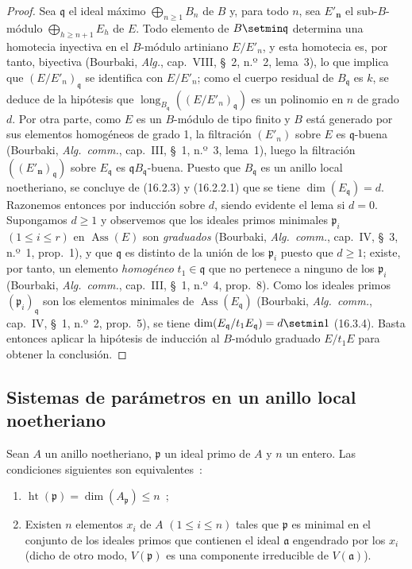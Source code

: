 \begin{proof}
Sea $\mathfrak{q}$ el ideal máximo $\bigoplus_{n\geq1}B_n$ de $B$ y, para todo
$n$, sea $E'_{\boldsymbol n}$ el sub-$B$-módulo $\bigoplus_{h\geq n+1}E_h$ de $E$. Todo
elemento de $B\setmin\mathfrak{q}$ determina una homotecia inyectiva en el
$B$-módulo artiniano $E/E'_n$, y esta homotecia es, por tanto, biyectiva
(Bourbaki, \emph{Alg.}, cap.~VIII, \S~2, n.º~2, lema~3), lo que implica que
$(E/E'_n)_{\mathfrak{q}}$ se identifica con $E/E'_n$; como el cuerpo residual
de $B_{\mathfrak{q}}$ es $k$, se deduce de la hipótesis que
$\operatorname{long}_{B_{\mathfrak{q}}}((E/E'_n)_{\mathfrak{q}})$ es un
polinomio en $n$ de grado $d$. Por otra parte, como $E$ es un $B$-módulo de
tipo finito y $B$ está generado por sus elementos homogéneos de grado 1, la
filtración $(E'_n)$ sobre $E$ es $\mathfrak{q}$-buena (Bourbaki,
\emph{Alg.~comm.}, cap.~III, \S~1, n.º~3, lema~1), luego la filtración
$((E'_{\boldsymbol n})_{\mathfrak{q}})$ sobre $E_{\mathfrak{q}}$ es
$\mathfrak{q}B_{\mathfrak{q}}$-buena. Puesto que $B_{\mathfrak{q}}$ es un
anillo local noetheriano, se concluye de (16.2.3) y (16.2.2.1) que se tiene
$\dim(E_{\mathfrak{q}})=d$. Razonemos entonces por inducción sobre $d$, siendo
evidente el lema si $d=0$. Supongamos $d\geq1$ y observemos que los ideales
primos minimales $\mathfrak{p}_i$ $(1\leq i\leq r)$ en
$\operatorname{Ass}(E)$ son \emph{graduados} (Bourbaki, \emph{Alg.~comm.},
cap.~IV, \S~3, n.º~1, prop.~1), y que $\mathfrak{q}$ es distinto de la unión
de los $\mathfrak{p}_i$ puesto que $d\geq1$; existe, por tanto, un elemento
\emph{homogéneo} $t_1\in\mathfrak{q}$ que no pertenece a ninguno de los
$\mathfrak{p}_i$ (Bourbaki, \emph{Alg.~comm.}, cap.~III, \S~1, n.º~4,
prop.~8). Como los ideales primos $(\mathfrak{p}_i)_{\mathfrak{q}}$ son los
elementos minimales de $\operatorname{Ass}(E_{\mathfrak{q}})$ (Bourbaki,
\emph{Alg.~comm.}, cap.~IV, \S~1, n.º~2, prop.~5), se tiene
$\dim(E_{\mathfrak{q}}/t_1E_{\mathfrak{q}})=d\setmin 1$ (16.3.4). Basta entonces
aplicar la hipótesis de inducción al $B$-módulo graduado $E/t_1E$ para obtener
la conclusión.
\end{proof}
\subsection{Sistemas de parámetros en un anillo local noetheriano}
\label{subsection:0.16.3-es}

\begin{proposition}[16.3.1]
\label{0.16.3.1-es}
Sean $A$ un anillo noetheriano, $\mathfrak{p}$ un ideal primo de $A$ y $n$ un
entero. Las condiciones siguientes son equivalentes~:
\begin{enumerate}
  \item[\textup{a)}] $\operatorname{ht}(\mathfrak{p})=
  \dim(A_{\mathfrak{p}})\leq n$~;
  \item[\textup{b)}] Existen $n$ elementos $x_i$ de $A$ $(1\leq i\leq n)$ tales que
  $\mathfrak{p}$ es minimal en el conjunto de los ideales primos que contienen
  el ideal $\mathfrak{a}$ engendrado por los $x_i$ \textup{(dicho de otro modo,}
  $V(\mathfrak{p})$ es una componente irreducible de $V(\mathfrak{a})$).
\end{enumerate}
\end{proposition}

